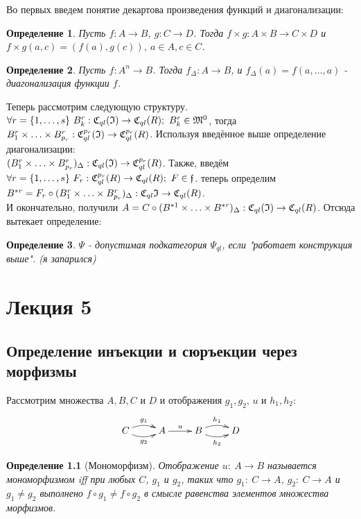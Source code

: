 \documentclass[a4paper, 12pt]{report}
\newtheorem{definition}{Определение}[chapter]
\begin{document}
Во первых введем понятие декартова произведения функций и диагонализации:
\begin{definition}
    Пусть $f: A\rightarrow B$, $g: C\rightarrow D$. Тогда $f\times g: A\times B\rightarrow C\times D$ и $f\times g (a, c) = (f(a), g(c)),\ a\in A, c\in C$.
\end{definition}
\begin{definition}
    Пусть $f: A^n\rightarrow B$. Тогда $f_{\Delta}: A\rightarrow B$, и $f_{\Delta}(a) = f(a,\ldots, a)$ - диагонализация функции $f$.
\end{definition}

Теперь рассмотрим следующую структуру.
$\forall r=\{1,\ldots, s\}\ B_k^r: \mathfrak{C}_{ql}(\mathfrak{I})\rightarrow\mathfrak{C}_{ql}(R);\ B_k^r\in\mathfrak{M}^0$, тогда \\
$B_1^r\times\ldots\times B_{p_r}^r: \mathfrak{C}_{ql}^{p_r}(\mathfrak{I})\rightarrow \mathfrak{C}_{ql}^{p_r}(R)$. Используя введённое выше определение диагонализации:\\
$(B_1^r\times\ldots\times B_{p_r}^r)_{\Delta}: \mathfrak{C}_{ql}(\mathfrak{I})\rightarrow \mathfrak{C}_{ql}^{p_r}(R)$. Также, введём\\
$\forall r=\{1,\ldots, s\}\ F_r: \mathfrak{C}_{ql}^{p_r}(R) \rightarrow \mathfrak{C}_{ql}(R);\ F\in\mathfrak{f}$. теперь определим\\
$B^{*r} = F_r\circ(B_1^r\times\ldots\times B_{p_r}^r)_{\Delta}: \mathfrak{C}_{ql}{\mathfrak{I}}\rightarrow\mathfrak{C}_{ql}(R)$.\\
И окончательно, получили $A = C\circ(B^{*1}\times\ldots\times B^{*r})_{\Delta}: \mathfrak{C}_{ql}(\mathfrak{I})\rightarrow \mathfrak{C}_{ql}(R)$. Отсюда вытекает определение:
\begin{definition}
    $\Psi$ - допустимая подкатегория $\Psi_{ql}$, если "работает конструкция выше". (я запарился)
\end{definition}


\chapter{Лекция 5}
\section{Определение инъекции и сюръекции через морфизмы}

Рассмотрим множества $A, B, C$ и $D$ и отображения $g_1, g_2$, $u$ и $h_1, h_2$:
\begin{equation*}
\xymatrix{
C\ar@/^/[r]^{g_1}\ar@/_/[r]_{g_2} & A\ar[r]^u & B\ar@/^/[r]^{h_1}\ar@/_/[r]_{h_2} & D
}
\end{equation*}

\begin{definition}[Мономорфизм]
Отображение $u:\ A \rightarrow B$ называется мономорфизмом iff при любых $C$, $g_1$ и $g_2$, таких что $g_1:\ C \rightarrow A$, $g_2:\ C \rightarrow A$ и $g_1 \neq g_2$ выполнено $f \circ g_1 \neq f \circ g_2$ в смысле равенства элементов множества морфизмов.
\end{definition}
\end{document}
